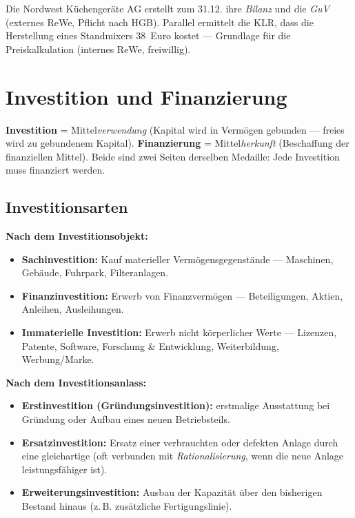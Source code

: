 \documentclass[11pt, a4paper]{article}
\begin{document}
\begin{beispiel}
Die Nordwest Küchengeräte AG erstellt zum 31.12. ihre \emph{Bilanz} und die \emph{GuV}
(externes ReWe, Pflicht nach HGB). Parallel ermittelt die KLR, dass die Herstellung eines
Standmixers 38~Euro kostet --- Grundlage für die Preiskalkulation (internes ReWe,
freiwillig).
\end{beispiel}

\section{Investition und Finanzierung}

\begin{merksatz}
\textbf{Investition} = Mittel\emph{verwendung} (Kapital wird in Vermögen gebunden ---
freies wird zu gebundenem Kapital). \textbf{Finanzierung} = Mittel\emph{herkunft}
(Beschaffung der finanziellen Mittel). Beide sind zwei Seiten derselben Medaille: Jede
Investition muss finanziert werden.
\end{merksatz}

\subsection{Investitionsarten}

\textbf{Nach dem Investitionsobjekt:}
\begin{itemize}
  \item \textbf{Sachinvestition:} Kauf materieller Vermögensgegenstände --- Maschinen,
    Gebäude, Fuhrpark, Filteranlagen.
  \item \textbf{Finanzinvestition:} Erwerb von Finanzvermögen --- Beteiligungen, Aktien,
    Anleihen, Ausleihungen.
  \item \textbf{Immaterielle Investition:} Erwerb nicht körperlicher Werte --- Lizenzen,
    Patente, Software, Forschung \& Entwicklung, Weiterbildung, Werbung/Marke.
\end{itemize}

\textbf{Nach dem Investitionsanlass:}
\begin{itemize}
  \item \textbf{Erstinvestition (Gründungsinvestition):} erstmalige Ausstattung bei
    Gründung oder Aufbau eines neuen Betriebsteils.
  \item \textbf{Ersatzinvestition:} Ersatz einer verbrauchten oder defekten Anlage durch
    eine gleichartige (oft verbunden mit \emph{Rationalisierung}, wenn die neue Anlage
    leistungsfähiger ist).
  \item \textbf{Erweiterungsinvestition:} Ausbau der Kapazität über den bisherigen Bestand
    hinaus (z.\,B. zusätzliche Fertigungslinie).
\end{itemize}
\end{document}
